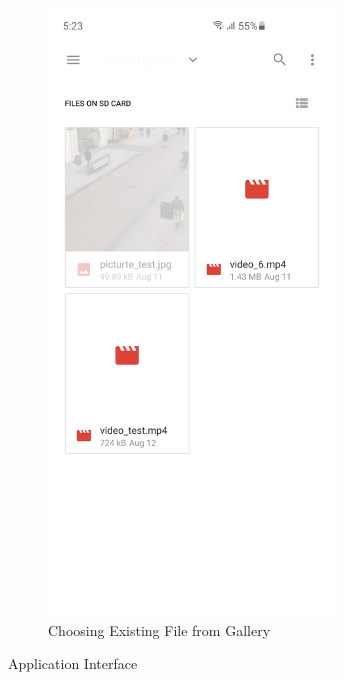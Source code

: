 \begin{figure}[h!]
\begin{subfigure}{.5\textwidth}
        \includegraphics[width=3in]{images/appendix-b/sh-choosing.jpg}
        \caption{Choosing Existing File from Gallery}
        \label{appendix-b:filePicker}
        \end{subfigure}
        \caption{Application Interface}
        \label{appendix-b:process}
    \end{figure}

